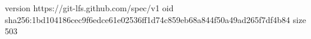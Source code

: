 version https://git-lfs.github.com/spec/v1
oid sha256:1bd104186cec9f6edce61e02536ff1d74c859eb68a844f50a49ad265f7df4b84
size 503
